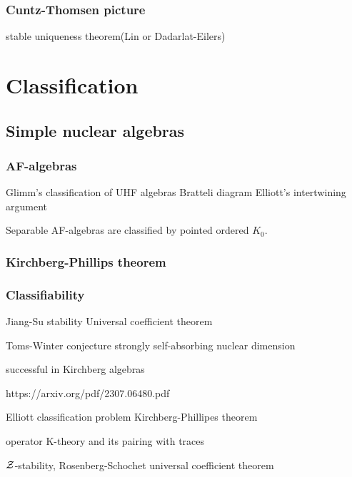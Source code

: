 \documentclass{../../large}
\begin{document}
\section{Cuntz-Thomsen picture}


stable uniqueness theorem(Lin or Dadarlat-Eilers)


\chapter{}








\part{Classification}
\chapter{Simple nuclear algebras}


\section{AF-algebras}

Glimm's classification of UHF algebras
Bratteli diagram
Elliott's intertwining argument

Separable AF-algebras are classified by pointed ordered $K_0$.


\section{Kirchberg-Phillips theorem}

\section{Classifiability}
Jiang-Su stability
Universal coefficient theorem

Toms-Winter conjecture
strongly self-absorbing
nuclear dimension




successful in Kirchberg algebras


https://arxiv.org/pdf/2307.06480.pdf

Elliott classification problem
Kirchberg-Phillipes theorem

operator K-theory and its pairing with traces

$\mathcal{Z}$-stability, Rosenberg-Schochet universal coefficient theorem
\end{document}
